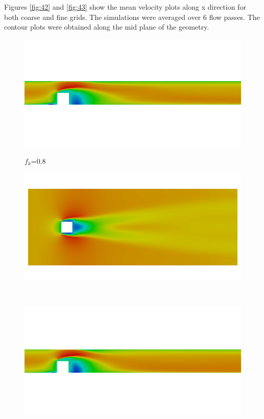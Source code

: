 Figures \ref{fig:42} and \ref{fig:43} show the mean velocity plots along x direction for both coarse and fine grids. The simulations were averaged over 6 flow passes. The contour plots were obtained along the mid plane of the geometry. 


\begin{figure}[H]
\begin{minipage}[b]{0.5\linewidth}
\includegraphics[scale=0.25]{figure/coarse/eight/Umean_z.png}
\caption*{$f_k$=0.8}
\end{minipage}
\begin{minipage}[b]{0.5\linewidth}
\includegraphics[scale=0.25]{figure/coarse/eight/Umean_y.png}
\caption*{}
\end{minipage}\\
\begin{minipage}[b]{0.5\linewidth}
\includegraphics[scale=0.25]{figure/coarse/three/Umean_z.png}

\end{minipage}
\end{figure}
